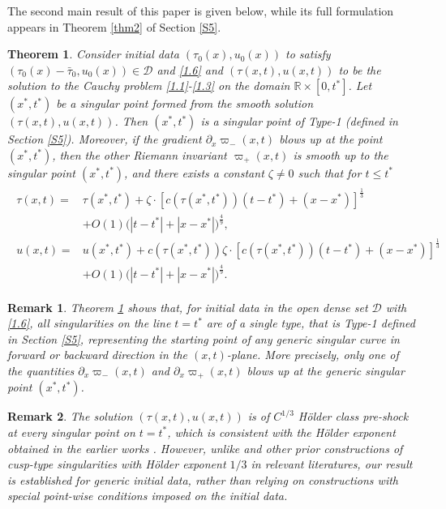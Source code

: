 \documentclass[11pt,reqno]{article}
\newtheorem{thmABC}{Theorem}
\newtheorem{rem}{Remark}
\newcommand{\fr}{\frac}
\newcommand{\pa}{\partial}
\numberwithin{equation}{section}
\begin{document}
The second main result of this paper is given below, while its full formulation appears in Theorem \ref{thm2} of Section \ref{S5}.
\begin{thmABC}\label{thmB}
Consider initial data $(\tau_0(x), u_0(x))$ to satisfy $(\tau_0(x)-\bar{\tau}_0, u_0(x))\in \mathcal{D}$  and \eqref{1.6} and $(\tau(x,t), u(x,t))$ to be the solution to the Cauchy problem \eqref{1.1}-\eqref{1.3} on the domain $\mathbb{R}\times[0, t^*]$. Let $(x^*, t^*)$ be a singular point formed from the smooth solution $(\tau(x,t), u(x,t))$. Then $(x^*, t^*)$ is a singular point of Type-1 (defined in Section \ref{S5}). Moreover, if the gradient $\pa_x\varpi_-(x,t)$ blows up at the point $(x^*, t^*)$, then the other Riemann invariant $\varpi_+(x,t)$ is smooth up to the singular point $(x^*, t^*)$, and there exists a constant $\zeta\neq0$ such that for $t\leq t^*$
\begin{align}\label{1.7}
\begin{split}
\tau(x,t)=&\tau(x^*,t^*) +\zeta\cdot [c(\tau(x^*,t^*))(t-t^*)+(x-x^*)]^{\fr{1}{3}} \\ &+O(1)\Big(|t-t^*|+|x-x^*|\Big)^{\fr{4}{9}}, \\
u(x,t)=&u(x^*,t^*) +c(\tau(x^*, t^*))\zeta\cdot [c(\tau(x^*,t^*))(t-t^*)+(x-x^*)]^{\fr{1}{3}} \\ &+O(1)\Big(|t-t^*|+|x-x^*|\Big)^{\fr{4}{9}}.
\end{split}
\end{align}
\end{thmABC}
\begin{rem}
Theorem \ref{thmB} shows that, for initial data in the open dense set $\mathcal{D}$ with \eqref{1.6}, all singularities on the line $t=t^*$ are of a single type, that is Type-1 defined in Section \ref{S5}, representing the starting point of any generic singular curve in forward or backward direction in the $(x,t)$-plane.
More precisely, only one of the quantities $\pa_x\varpi_-(x,t)$ and $\pa_x\varpi_+(x,t)$ blows up at the generic singular point $(x^*, t^*)$.
\end{rem}
\begin{rem}
The solution $(\tau(x,t), u(x,t))$ is of $C^{1/3}$ H\"older class pre-shock at every singular point on $t=t^*$, which is consistent with the H\"older exponent obtained in the earlier works \cite{CD, Leb}. However, unlike \cite{CD, Leb} and other prior constructions of cusp-type singularities with H\"older exponent $1/3$ in relevant literatures, our result is established for generic initial data, rather than relying on constructions with special point-wise conditions imposed on the initial data.
\end{rem}
\end{document}
